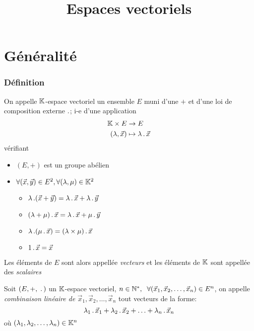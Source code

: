 

\title{Espaces vectoriels}



\maketitle
\pagebreak
\tableofcontents



\part{Généralité}


\section{Définition}

\begin{dfn}
On appelle $\mathbb{K}$-espace vectoriel un ensemble $E$ muni d'une \lci $+$ et
d'une loi de composition externe $\operatorname{.}$; i-e d'une application
\begin{align*}
            \mathbb{K} \times E &\to E \\
    (\lambda, \vec{x})  &\mapsto \lambda \operatorname{.} \vec{x}
\end{align*}
vérifiant
\begin{itemize}
    \item $(E, +)$ est un groupe abélien
    \item $\forall (\vec{x}, \vec{y}) \in E^2, \forall (\lambda, \mu) \in \mathbb{K}^2$
    \begin{itemize}
        \item $\lambda \operatorname{.} (\vec{x} + \vec{y})
        = \lambda \operatorname{.} \vec{x} + \lambda \operatorname{.} \vec{y}$
        \item $(\lambda + \mu) \operatorname{.} \vec{x}
        = \lambda \operatorname{.} \vec{x} + \mu \operatorname{.} \vec{y}$
        \item $\lambda \operatorname{.} (\mu \operatorname{.} \vec{x})
        = (\lambda \times \mu) \operatorname{.} \vec{x}$
        \item $1 \operatorname{.} \vec{x} = \vec{x}$
    \end{itemize}
\end{itemize}
Les éléments de $E$ sont alors appellée \emph{vecteurs} et les éléments de
$\mathbb{K}$ sont appellée des \emph{scalaires}
\end{dfn}

\begin{dfn}
Soit $(E, +, \;\operatorname{.}\,)$ un $\mathbb{K}$-espace vectoriel, $n \in \mathbb{N}^*, \;\; \forall 
(\vec{x}_1, \vec{x}_2, \ldots, \vec{x}_n) \in E^n$, on appelle
\emph{combinaison linéaire de $\vec{x}_1, \vec{x}_2, \ldots, \vec{x}_n$}
tout vecteurs de la forme:
\[
    \lambda_1 \operatorname{.} \vec{x}_1 + \lambda_2 \operatorname{.} \vec{x}_2 + \ldots +
    \lambda_n \operatorname{.} \vec{x}_n
\]
où $(\lambda_1, \lambda_2, \ldots, \lambda_n) \in \mathbb{K}^n$
\end{dfn}

